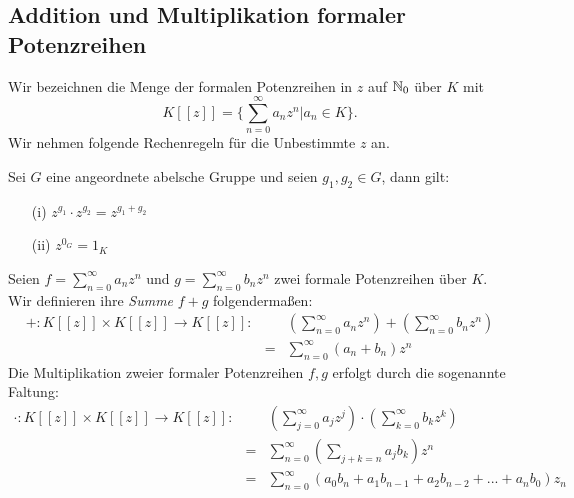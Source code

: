\subsection{Addition und Multiplikation formaler Potenzreihen} \label{Rechnen}
Wir bezeichnen die Menge der formalen Potenzreihen in $z$ auf $\mathbb{N}_0$ über $K$ mit \[K [[z]] = \lbrace \sum_{n=0}^\infty a_n z^n \vert a_n\in K \rbrace. \]
%
%
Wir nehmen folgende Rechenregeln für die Unbestimmte $z$ an.
\begin{lemma}\label{Potenzgesetze}
Sei $G$ eine angeordnete abelsche Gruppe und seien $g_1, g_2 \in G$, dann gilt:
\begin{itemize}
\item[(i)] $z^{g_1} \cdot z^{g_2} = z^{g_1 + g_2}$
\item[(ii)] $z^{0_G} = 1_K$
\end{itemize}
\end{lemma}
%
%
\begin{defn}\label{AdditionMultiplikationPotenzreihen}
%
Seien $f = \sum_{n=0}^\infty a_n z^n$ und $g = \sum_{n=0}^\infty b_n z^n$ zwei formale Potenzreihen über $K$. Wir definieren ihre \textit{Summe} $f+g$ folgendermaßen:
\begin{eqnarray*}
+ \colon K [[z]] \times K [[z]] \to K[[z]]:&&\left( \sum_{n=0}^\infty a_n z^n \right) + \left( \sum_{n=0}^\infty b_n z^n \right) \\
&=& \sum_{n=0}^{\infty} (a_n + b_n) z^n 
\end{eqnarray*}
%
%
% 
%
%
Die Multiplikation zweier formaler Potenzreihen $f,g$ erfolgt durch die sogenannte Faltung:
\begin{eqnarray*}
\cdot\colon  K [[z]] \times K [[z]] \to K[[z]]:&& \left( \sum_{j=0}^\infty a_j z^j \right)\cdot \left( \sum_{k=0}^\infty b_k z^k \right) \\
&=& \sum_{n=0}^\infty \left(\sum_{j+k=n} a_j b_k\right) z^n \\
&=& \sum_{n= 0}^\infty \left(a_0b_n + a_1b_{n-1} + a_2b_{n-2} + ... + a_nb_0 \right)z_n
\end{eqnarray*}
\end{defn}
%
\vspace{0.8cm}
%
%
%
% 
